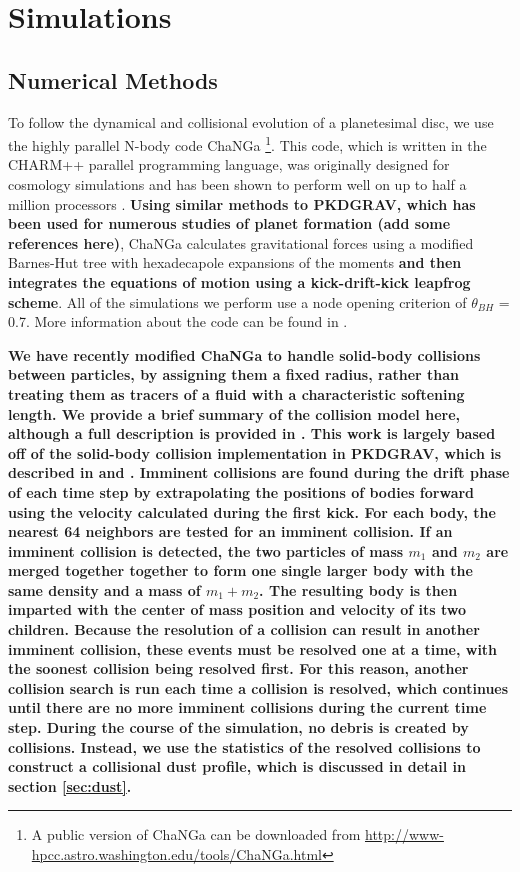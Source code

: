\documentclass[fleqn,usenatbib]{mnras}
\begin{document}
\section{Simulations} \label{sec:sims}

\subsection{Numerical Methods}\label{sec:methods}

To follow the dynamical and collisional evolution of a planetesimal disc, we use the highly parallel N-body code {\sc ChaNGa} 
\footnote{A public version of {\sc ChaNGa} can be downloaded from \url{http://www-hpcc.astro.washington.edu/tools/ChaNGa.html}}. 
This code, which is written in the {\sc CHARM++} parallel programming language, was originally designed for cosmology simulations 
and has been shown to perform well on up to half a million processors \citep{2015AphCom..2..1}. \textbf{Using similar methods to {\sc PKDGRAV}, which has been used for numerous studies of planet formation (add some references here)}, {\sc ChaNGa} calculates 
gravitational forces using a modified Barnes-Hut \citep{1986Natur.324..446B} tree with hexadecapole expansions of the moments \textbf{and then integrates the equations of motion using a kick-drift-kick leapfrog scheme}. 
All of the simulations we perform use a node opening criterion of $\theta_{BH}$ = 0.7. More information about the code can be found 
in \citet{2008IEEEpds...ChaNGa}.

\textbf{We have recently modified {\sc ChaNGa} to handle solid-body collisions between particles, by assigning them a fixed radius, rather than treating them as tracers of a fluid with a characteristic softening length. We provide a brief summary of the collision model here, although a full description is provided in \citet{2019MNRAS.489.2159W}. This work is largely based off of the solid-body collision implementation in {\sc PKDGRAV}, which is described in \citet{1994MNRAS.269..493R} and \citet{2000Icar..143...45R}. Imminent collisions are found during the drift phase of each time step by extrapolating the positions of bodies forward using the velocity calculated during the first kick. For each body, the nearest 64 neighbors are tested for an imminent collision. If an imminent collision is detected, the two particles of mass $m_{1}$ and $m_{2}$ are merged together together to form one single larger body with the same density and a mass of $m_{1} + m_{2}$. The resulting body is then imparted with the center of mass position and velocity of its two children. Because the resolution of a collision can result in another imminent collision, these events must be resolved one at a time, with the soonest collision being resolved first. For this reason, another collision search is run each time a collision is resolved, which continues until there are no more imminent collisions during the current time step. During the course of the simulation, no debris is created by collisions. Instead, we use the statistics of the resolved collisions to construct a collisional dust profile, which is discussed in detail in section \ref{sec:dust}.}
\end{document}

